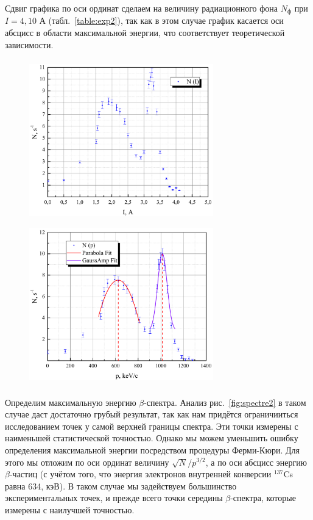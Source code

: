 \documentclass[a4paper,12pt]{article} %
\begin{document}
		Сдвиг графика по оси ординат сделаем на величину радиационного фона $N_\text{ф}$ при $I = 4,10$ А (табл.~\ref{table:exp2}), так как в этом случае график касается оси абсцисс в области максимальной энергии, что соответствует теоретической зависимости.
		\begin{figure}[h!]
			\begin{floatrow}
				{\includegraphics[width=8cm,height=7cm]{graph0.pdf}}
				{\includegraphics[width=8cm,height=7cm]{graph1.pdf}}     
			\end{floatrow}
		\end{figure}
		
		\newpage
		Определим максимальную энергию $\beta$-спектра. Анализ рис.~\ref{fig:spectre2} в таком случае даст достаточно грубый результат, так как нам придётся ограничииться исследованием точек у самой верхней границы спектра. Эти точки измерены с наименьшей статистической точностью. Однако мы можем уменьшить ошибку определения максимальной энергии посредством процедуры Ферми-Кюри. Для этого мы отложим по оси ординат величину $\sqrt{N}/p^{3/2}$, а по оси абсцисс энергию $\beta$-частиц (с учётом того, что энергия электронов внутренней конверсии $^{137}$Cs равна 634, кэВ). В таком случае мы задействуем большинство экспериментальных точек, и прежде всего точки середины $\beta$-спектра, которые измерены с наилучшей точностью.
		
\end{document}
